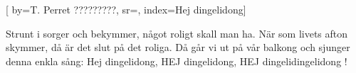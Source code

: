 [ 		
	by={T. Perret ?????????},					
	sr={},
	index={Hej dingelidong}]		
	
\beginverse*						
Strunt i sorger och bekymmer,
något roligt skall man ha.
När som livets afton skymmer,
då är det slut på det roliga.
Då går vi ut på vår balkong
och sjunger denna enkla sång:
Hej dingelidong,
HEJ dingelidong,
HEJ dingelidingelidong !
\endverse										
\endsong		
